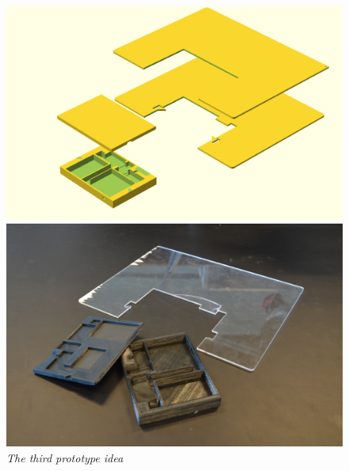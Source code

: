 \begin{figure}[h]
\begin{minipage}[b]{7.5cm}
\centering
\includegraphics[scale=0.235]{figures/iterations/v4.png}
\end{minipage}
\begin{minipage}[b]{7.5cm}
\centering
\includegraphics[scale=0.58]{figures/iterations/v4-photo.jpg}
\end{minipage}
\caption{\small {\it {The third prototype idea}}} \label{fig:v3}
\end{figure}


